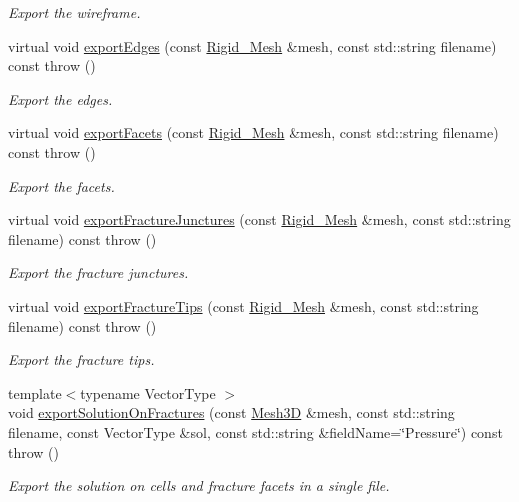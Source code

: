 \begin{DoxyCompactItemize}
\begin{DoxyCompactList}\small\item\em Export the wireframe. \end{DoxyCompactList}\item 
virtual void \hyperlink{classFVCode3D_1_1ExporterVTU_a3ee8f96689d31f85372b580caffdcc7e}{export\+Edges} (const \hyperlink{classFVCode3D_1_1Rigid__Mesh}{Rigid\+\_\+\+Mesh} \&mesh, const std\+::string filename) const   throw ()
\begin{DoxyCompactList}\small\item\em Export the edges. \end{DoxyCompactList}\item 
virtual void \hyperlink{classFVCode3D_1_1ExporterVTU_a15e1d2e6940ac0a37bf3c4d0ee5dc4d5}{export\+Facets} (const \hyperlink{classFVCode3D_1_1Rigid__Mesh}{Rigid\+\_\+\+Mesh} \&mesh, const std\+::string filename) const   throw ()
\begin{DoxyCompactList}\small\item\em Export the facets. \end{DoxyCompactList}\item 
virtual void \hyperlink{classFVCode3D_1_1ExporterVTU_aef7601095b83f975d009f9cb68563ae4}{export\+Fracture\+Junctures} (const \hyperlink{classFVCode3D_1_1Rigid__Mesh}{Rigid\+\_\+\+Mesh} \&mesh, const std\+::string filename) const   throw ()
\begin{DoxyCompactList}\small\item\em Export the fracture junctures. \end{DoxyCompactList}\item 
virtual void \hyperlink{classFVCode3D_1_1ExporterVTU_a95853064ccbdab9ab24b3aa6f67ff19c}{export\+Fracture\+Tips} (const \hyperlink{classFVCode3D_1_1Rigid__Mesh}{Rigid\+\_\+\+Mesh} \&mesh, const std\+::string filename) const   throw ()
\begin{DoxyCompactList}\small\item\em Export the fracture tips. \end{DoxyCompactList}\item 
{\footnotesize template$<$typename Vector\+Type $>$ }\\void \hyperlink{classFVCode3D_1_1ExporterVTU_abc88a5113c02b55942862ef39b30ec80}{export\+Solution\+On\+Fractures} (const \hyperlink{classFVCode3D_1_1Mesh3D}{Mesh3D} \&mesh, const std\+::string filename, const Vector\+Type \&sol, const std\+::string \&field\+Name=\char`\"{}Pressure\char`\"{}) const   throw ()
\begin{DoxyCompactList}\small\item\em Export the solution on cells and fracture facets in a single file. \end{DoxyCompactList}\item 

\end{DoxyCompactItemize}
